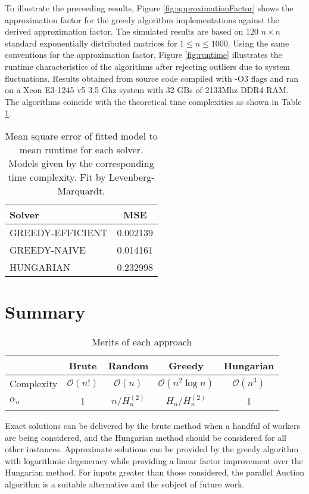 \documentclass{article}
\newcommand{\boundedBy}[1]{\mathcal{O} \left ( #1 \right )}
\begin{document}
To illustrate the preceeding results, Figure \ref{fig:approximationFactor} shows the approximation factor for the greedy algorithm implementations against the derived approximation factor. The simulated results are based on 120 $n \times n$ standard exponentially distributed matrices for $1 \le n \le 1000$. Using the same conventions for the approximation factor, Figure \ref{fig:runtime} illustrates the runtime characteristics of the algorithms after rejecting outliers due to system fluctuations. Results obtained from source code compiled with -O3 flags and ran on a Xeon E3-1245 v5 3.5 Ghz system with 32 GBs of 2133Mhz DDR4 RAM. The algorithms coincide with the theoretical time complexities as shown in Table \ref{tbl:runtime:mse}.

\begin{table}[H]
	\centering
	\begin{tabular}{l|c}
		Solver & MSE \\
		\hline
		GREEDY-EFFICIENT & 0.002139 \\
		GREEDY-NAIVE & 0.014161 \\
		HUNGARIAN & 0.232998
	\end{tabular}
	\caption{Mean square error of fitted model to mean runtime for each solver. Models given by the corresponding time complexity. Fit by Levenberg-Marquardt.}
	\label{tbl:runtime:mse}
\end{table}

\section{Summary}

\begin{table}[H]
	\centering
	\begin{tabular}{l|c|c|c|c}
		& Brute & Random & Greedy & Hungarian \\
		\hline
		Complexity & $\boundedBy{n!}$ & $\boundedBy{n}$ & $\boundedBy{n^2 \log n}$ & $\boundedBy{n^3}$ \\
		$\alpha_n$ & 1 & $n / H_n^{(2)}$ & $H_n / H_n^{(2)}$ & 1
	\end{tabular}
	\caption{Merits of each approach}
\end{table}

Exact solutions can be delivered by the brute method when a handful of workers are being considered, and the Hungarian method should be considered for all other instances. Approximate solutions can be provided by the greedy algorithm with logarithmic degeneracy while providing a linear factor improvement over the Hungarian method. For inputs greater than those considered, the parallel Auction algorithm \cite{bertsekas1988auction} is a suitable alternative and the subject of future work.



\end{document}
